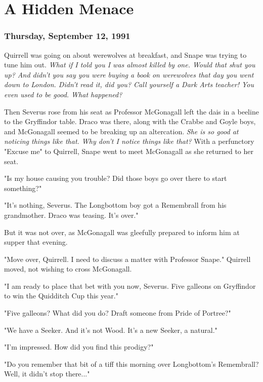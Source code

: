 
\chapter{A Hidden Menace}

\subsection{Thursday, September 12, 1991}

Quirrell was going on about werewolves at breakfast, and Snape was trying to tune him out. \emph{What if I told you I was almost killed by one. Would that shut you up? And didn't you say you were buying a book on werewolves that day you went down to London. Didn't read it, did you? Call yourself a Dark Arts teacher! You even used to be good. What happened?}

Then Severus rose from his seat as Professor McGonagall left the dais in a beeline to the Gryffindor table. Draco was there, along with the Crabbe and Goyle boys, and McGonagall seemed to be breaking up an altercation. \emph{She is so good at noticing things like that. Why don't I notice things like that?} With a perfunctory "Excuse me" to Quirrell, Snape went to meet McGonagall as she returned to her seat.

"Is my house causing you trouble? Did those boys go over there to start something?"

"It's nothing, Severus. The Longbottom boy got a Remembrall from his grandmother. Draco was teasing. It's over."

But it was not over, as McGonagall was gleefully prepared to inform him at supper that evening.

"Move over, Quirrell. I need to discuss a matter with Professor Snape." Quirrell moved, not wishing to cross McGonagall.

"I am ready to place that bet with you now, Severus. Five galleons on Gryffindor to win the Quidditch Cup this year."

"Five galleons? What did you do? Draft someone from Pride of Portree?"

"We have a Seeker. And it's not Wood. It's a new Seeker, a natural."

"I'm impressed. How did you find this prodigy?"

"Do you remember that bit of a tiff this morning over Longbottom's Remembrall? Well, it didn't stop there..."

